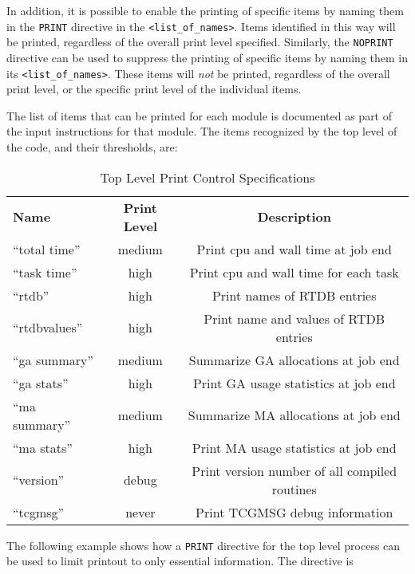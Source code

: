 In addition, it is possible to enable the printing of specific
items by naming them in the \verb+PRINT+ directive in the 
\verb+<list_of_names>+.  Items identified in this way will be printed, 
regardless of the overall print level specified.  Similarly, the 
\verb+NOPRINT+ directive can be used to suppress the printing of specific
items by naming them in its \verb+<list_of_names>+.  These items will
{\em not} be printed, regardless of the overall print level, or the 
specific print level of the individual items.

The list of items that can be printed for each module is documented 
as part of the input instructions for that module.
The items recognized by the top level of the code, and their thresholds, 
are:
\begin{table}[htbp]
\begin{center}
\begin{tabular}{lcc}
  {\bf Name}          & {\bf Print Level} & {\bf Description} \\
 ``total time''        & medium & Print cpu and wall time at job end\\
 ``task time''         & high   & Print cpu and wall time for each task\\
 ``rtdb''              & high    & Print names of RTDB entries\\
 ``rtdbvalues''        & high    & Print name and values of RTDB entries\\
 ``ga summary''        & medium & Summarize GA allocations at job end \\
 ``ga stats''          & high   & Print GA usage statistics at job end \\
 ``ma summary''        & medium & Summarize MA allocations at job end \\
 ``ma stats''          & high   & Print MA usage statistics at job end \\
 ``version''           & debug  & Print version number of all compiled routines \\
  ``tcgmsg''           & never  & Print TCGMSG debug information \\
\end{tabular}
\end{center}
\caption{Top Level Print Control Specifications}
\end{table}


The following example shows how a \verb+PRINT+ directive for the top level
process can be used to limit printout to only essential information.
The directive is


